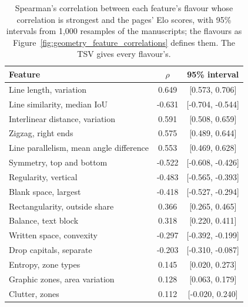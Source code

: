 \begin{table}[htbp]
  \centering
  \caption{Spearman's correlation between each feature's flavour whose correlation is strongest and the pages' Elo scores, with 95\% intervals from 1,000 resamples of the manuscripts; the flavours as Figure~\ref{fig:geometry_feature_correlations} defines them. The TSV gives every flavour's.}
  \label{tab:geometry_feature_correlations}
  \begin{tabular}{lcc}
    \toprule
    Feature & $\rho$ & 95\% interval \\
    \midrule
    Line length, variation & 0.649 & [0.573, 0.706] \\
    Line similarity, median IoU & -0.631 & [-0.704, -0.544] \\
    Interlinear distance, variation & 0.591 & [0.508, 0.659] \\
    Zigzag, right ends & 0.575 & [0.489, 0.644] \\
    Line parallelism, mean angle difference & 0.553 & [0.469, 0.628] \\
    Symmetry, top and bottom & -0.522 & [-0.608, -0.426] \\
    Regularity, vertical & -0.483 & [-0.565, -0.393] \\
    Blank space, largest & -0.418 & [-0.527, -0.294] \\
    Rectangularity, outside share & 0.366 & [0.265, 0.465] \\
    Balance, text block & 0.318 & [0.220, 0.411] \\
    Written space, convexity & -0.297 & [-0.392, -0.199] \\
    Drop capitals, separate & -0.203 & [-0.310, -0.087] \\
    Entropy, zone types & 0.145 & [0.020, 0.273] \\
    Graphic zones, area variation & 0.128 & [0.063, 0.179] \\
    Clutter, zones & 0.112 & [-0.020, 0.240] \\
    \bottomrule
  \end{tabular}
\end{table}
